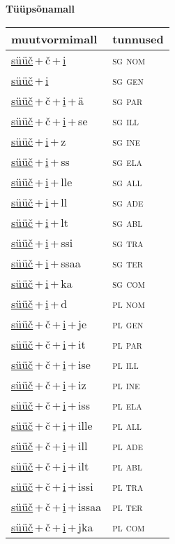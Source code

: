 
\vspace{1.8em}
\begin{minipage}{\textwidth}
\textbf{Tüüpsõnamall \,}\\

\begin{sideways}
\begin{tabular}{l l}
muutvormimall & tunnused \\
\hline
\underline{süüč}\,+\,č\,+\,\underline{i} & \textsc{ sg nom } \\
\underline{süüč}\,+\,\underline{i} & \textsc{ sg gen } \\
\underline{süüč}\,+\,č\,+\,\underline{i}\,+\,ä & \textsc{ sg par } \\
\underline{süüč}\,+\,č\,+\,\underline{i}\,+\,se & \textsc{ sg ill } \\
\underline{süüč}\,+\,\underline{i}\,+\,z & \textsc{ sg ine } \\
\underline{süüč}\,+\,\underline{i}\,+\,ss & \textsc{ sg ela } \\
\underline{süüč}\,+\,\underline{i}\,+\,lle & \textsc{ sg all } \\
\underline{süüč}\,+\,\underline{i}\,+\,ll & \textsc{ sg ade } \\
\underline{süüč}\,+\,\underline{i}\,+\,lt & \textsc{ sg abl } \\
\underline{süüč}\,+\,\underline{i}\,+\,ssi & \textsc{ sg tra } \\
\underline{süüč}\,+\,\underline{i}\,+\,ssaa & \textsc{ sg ter } \\
\underline{süüč}\,+\,\underline{i}\,+\,ka & \textsc{ sg com } \\
\underline{süüč}\,+\,\underline{i}\,+\,d & \textsc{ pl nom } \\
\underline{süüč}\,+\,č\,+\,\underline{i}\,+\,je & \textsc{ pl gen } \\
\underline{süüč}\,+\,č\,+\,\underline{i}\,+\,it & \textsc{ pl par } \\
\underline{süüč}\,+\,č\,+\,\underline{i}\,+\,ise & \textsc{ pl ill } \\
\underline{süüč}\,+\,č\,+\,\underline{i}\,+\,iz & \textsc{ pl ine } \\
\underline{süüč}\,+\,č\,+\,\underline{i}\,+\,iss & \textsc{ pl ela } \\
\underline{süüč}\,+\,č\,+\,\underline{i}\,+\,ille & \textsc{ pl all } \\
\underline{süüč}\,+\,č\,+\,\underline{i}\,+\,ill & \textsc{ pl ade } \\
\underline{süüč}\,+\,č\,+\,\underline{i}\,+\,ilt & \textsc{ pl abl } \\
\underline{süüč}\,+\,č\,+\,\underline{i}\,+\,issi & \textsc{ pl tra } \\
\underline{süüč}\,+\,č\,+\,\underline{i}\,+\,issaa & \textsc{ pl ter } \\
\underline{süüč}\,+\,č\,+\,\underline{i}\,+\,jka & \textsc{ pl com } \\
\end{tabular}
\end{sideways}
\label{tab:tüüpsõnamall-süüčči}


\end{minipage}
